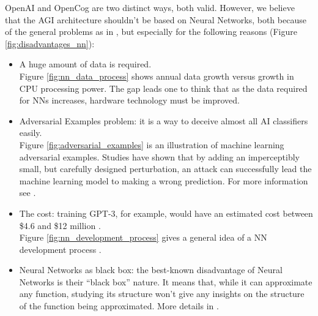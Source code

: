 OpenAI and OpenCog are two distinct ways, both valid. However, we believe that the AGI architecture shouldn't be based on Neural Networks, both because of the general problems as in \cite{323037}, but especially for the following reasons (Figure \ref{fig:disadvantages_nn}):


\begin{itemize}
	\item A huge amount of data is required. \\
Figure \ref{fig:nn_data_process} shows annual data growth versus growth in CPU processing power. The gap leads one to think that as the data required for NNs increases, hardware technology must be improved.
	\item Adversarial Examples problem: it is a way to deceive almost all AI classifiers easily. \\
Figure \ref{fig:adversarial_examples} is an illustration of machine learning adversarial examples. Studies have shown that by adding an imperceptibly small, but carefully designed perturbation, an attack can successfully lead the machine learning model to making a wrong prediction. For more information see \cite{42503, DBLP:journals/corr/abs-1905-10615, 7467366, goodfellow_2020}.
	\item The cost: training GPT-3, for example, would have an estimated cost between \$4.6 and \$12 million \cite{dickson_2020, wiggers_2021}. \\
Figure \ref{fig:nn_development_process} gives a general idea of a NN development process .  
	\item Neural Networks as black box: the best-known disadvantage of Neural Networks is their “black box” nature. It means that, while it can approximate any function, studying its structure won't give any insights on the structure of the function being approximated. More details in \cite{DBLP:journals/corr/abs-1911-12116}. 
\end{itemize}

